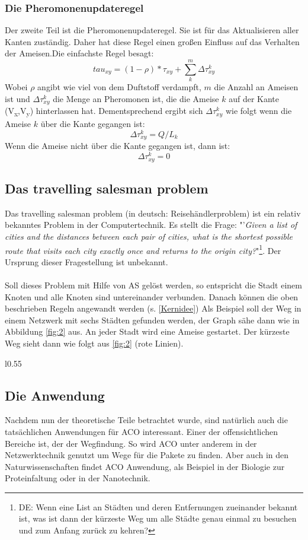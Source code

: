 \documentclass[12pt]{article}
\begin{document}
\subsubsection{Die Pheromonenupdateregel}
Der zweite Teil ist die Pheromonenupdateregel. Sie ist für das Aktualisieren aller Kanten zuständig. Daher hat diese Regel einen großen Einfluss auf das Verhalten der Ameisen.Die einfachste Regel besagt: \[tau_{xy}= (1-\rho)*\tau_{xy}+\sum_{k}^{m}{ \Delta\tau^k_{xy}} \]
Wobei $\rho$ angibt wie viel von dem Duftstoff verdampft, $m$ die Anzahl an Ameisen ist und $\Delta\tau^k_{xy}$ die Menge an Pheromonen ist, die die Ameise $k$ auf der Kante (V\textsubscript{x},V\textsubscript{y}) hinterlassen hat. Dementsprechend ergibt sich $\Delta\tau^k_{xy}$ wie folgt wenn die Ameise $k$ über die Kante gegangen ist:\[\Delta\tau^k_{xy}=Q/L_k\] Wenn die Ameise nicht über die Kante gegangen ist, dann ist: \[\Delta\tau^k_{xy}=0\]
\subsection{Das travelling salesman problem}\label{TSP}
Das travelling salesman problem (in deutsch: Reisehändlerproblem) ist ein relativ bekanntes Problem 
in der Computertechnik. Es stellt die Frage:
"'\textit{Given a list of cities and the distances between each pair of cities, what is the shortest possible route that visits each city exactly once and returns to the origin city?}"\cite{wiki_TSP}\footnote{DE: Wenn eine List an Städten und deren Entfernungen zueinander bekannt ist, was ist dann der kürzeste Weg um alle Städte genau einmal zu besuchen und zum Anfang zurück zu kehren?}. Der Ursprung dieser Fragestellung ist unbekannt.\\\\
Soll dieses Problem mit Hilfe von AS gelöst werden, so entspricht die Stadt einem Knoten und alle Knoten sind untereinander verbunden. Danach können die oben beschrieben Regeln angewandt werden (s. \ref{Kernidee})
Als Beispiel soll der Weg in einem Netzwerk mit sechs Städten gefunden werden, der Graph sähe dann wie in Abbildung \ref{fig:2} aus. An jeder Stadt wird eine Ameise gestartet. Der kürzeste Weg \cite{aco-sim} sieht dann wie folgt aus \ref{fig:2} (rote Linien).
\begin{wrapfigure}[13]{l}{0.55\textwidth}
\centering
{}
\caption{Netzwerk an Städten}
\label{fig:2}
\end{wrapfigure}
\subsection{Die Anwendung}
Nachdem nun der theoretische Teile betrachtet wurde, sind natürlich auch die tatsächlichen Anwendungen für ACO interessant. Einer der offensichtlichen Bereiche ist, der der Wegfindung. So wird ACO unter anderem in der Netzwerktechnik genutzt um Wege für die Pakete zu finden. Aber auch in den Naturwissenschaften findet ACO Anwendung, als Beispiel in der Biologie zur Proteinfaltung oder in der Nanotechnik. 
\end{document}
